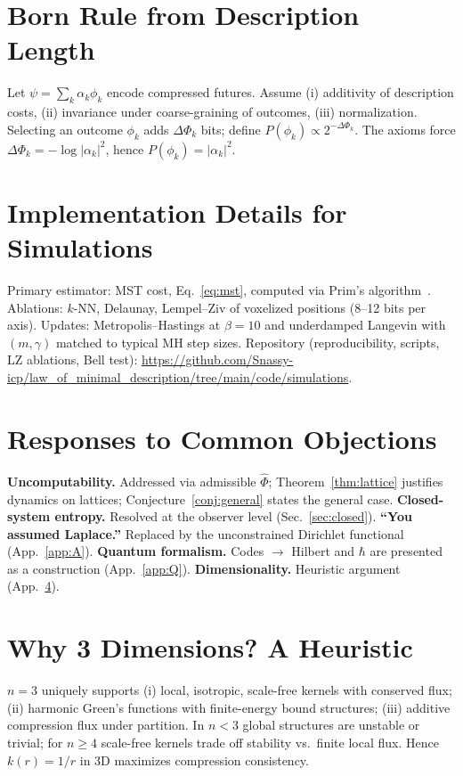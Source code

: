 \documentclass[aps,preprint,onecolumn,longbibliography,nofootinbib]{revtex4-2}
\numberwithin{equation}{section}        %
\begin{document}
\section{Born Rule from Description Length}\label{app:B}
Let $\psi=\sum_k \alpha_k \phi_k$ encode compressed futures. Assume (i) additivity of description costs, (ii) invariance under coarse-graining of outcomes, (iii) normalization. Selecting an outcome $\phi_k$ adds $\Delta\Phi_k$ bits; define $P(\phi_k)\propto 2^{-\Delta\Phi_k}$. The axioms force $\Delta\Phi_k=-\log|\alpha_k|^2$, hence $P(\phi_k)=|\alpha_k|^2$.

\section{Implementation Details for Simulations}\label{app:C}
Primary estimator: MST cost, Eq.~\eqref{eq:mst}, computed via Prim's algorithm~\cite{Prim1957}. Ablations: $k$-NN, Delaunay, Lempel–Ziv of voxelized positions (8–12 bits per axis). Updates: Metropolis–Hastings at $\beta{=}10$ and underdamped Langevin with $(m,\gamma)$ matched to typical MH step sizes. Repository (reproducibility, scripts, LZ ablations, Bell test): \url{https://github.com/Snassy-icp/law_of_minimal_description/tree/main/code/simulations}.

\section{Responses to Common Objections}\label{app:D}
\textbf{Uncomputability.} Addressed via admissible $\widehat\Phi$; Theorem~\ref{thm:lattice} justifies dynamics on lattices; Conjecture~\ref{conj:general} states the general case. \textbf{Closed-system entropy.} Resolved at the observer level (Sec.~\ref{sec:closed}). \textbf{“You assumed Laplace.”} Replaced by the unconstrained Dirichlet functional (App.~\ref{app:A}). \textbf{Quantum formalism.} Codes $\to$ Hilbert and $\hbar$ are presented as a construction (App.~\ref{app:Q}). \textbf{Dimensionality.} Heuristic argument (App.~\ref{app:E}).

\section{Why 3 Dimensions? A Heuristic}\label{app:E}
$n{=}3$ uniquely supports (i) local, isotropic, scale-free kernels with conserved flux; (ii) harmonic Green's functions with finite-energy bound structures; (iii) additive compression flux under partition. In $n{<}3$ global structures are unstable or trivial; for $n{\ge}4$ scale-free kernels trade off stability vs.\ finite local flux. Hence $k(r)=1/r$ in $3$D maximizes compression consistency.
\end{document}
